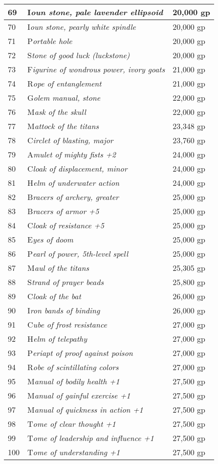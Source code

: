 \documentclass{article}
\begin{document}
\begin{tabular}{|>{\raggedright}p{14pt}|>{\raggedright}p{183pt}|>{\raggedright}p{55pt}|}
\hline
69 & I\textit{oun stone, pale lavender ellipsoid} & 20,000 gp\tabularnewline
\hline
70 & I\textit{oun stone, pearly white spindle} & 20,000 gp\tabularnewline
\hline
71 & P\textit{ortable hole} & 20,000 gp\tabularnewline
\hline
72 & S\textit{tone of good luck (luckstone)} & 20,000 gp\tabularnewline
\hline
73 & F\textit{igurine of wondrous power, ivory goats} & 21,000 gp\tabularnewline
\hline
74 & R\textit{ope of entanglement} & 21,000 gp\tabularnewline
\hline
75 & G\textit{olem manual, stone} & 22,000 gp\tabularnewline
\hline
76 & M\textit{ask of the skull} & 22,000 gp\tabularnewline
\hline
77 & M\textit{attock of the titans} & 23,348 gp\tabularnewline
\hline
78 & C\textit{irclet of blasting, major} & 23,760 gp\tabularnewline
\hline
79 & A\textit{mulet of mighty fists +2} & 24,000 gp\tabularnewline
\hline
80 & C\textit{loak of displacement, minor} & 24,000 gp\tabularnewline
\hline
81 & H\textit{elm of underwater action} & 24,000 gp\tabularnewline
\hline
82 & B\textit{racers of archery, greater} & 25,000 gp\tabularnewline
\hline
83 & B\textit{racers of armor +5} & 25,000 gp\tabularnewline
\hline
84 & C\textit{loak of resistance +5} & 25,000 gp\tabularnewline
\hline
85 & E\textit{yes of doom} & 25,000 gp\tabularnewline
\hline
86 & P\textit{earl of power, 5th-level spell} & 25,000 gp\tabularnewline
\hline
87 & M\textit{aul of the titans} & 25,305 gp\tabularnewline
\hline
88 & S\textit{trand of prayer beads} & 25,800 gp\tabularnewline
\hline
89 & C\textit{loak of the bat} & 26,000 gp\tabularnewline
\hline
90 & I\textit{ron bands of binding} & 26,000 gp\tabularnewline
\hline
91 & C\textit{ube of frost resistance} & 27,000 gp\tabularnewline
\hline
92 & H\textit{elm of telepathy} & 27,000 gp\tabularnewline
\hline
93 & P\textit{eriapt of proof against poison} & 27,000 gp\tabularnewline
\hline
94 & R\textit{obe of scintillating colors} & 27,000 gp\tabularnewline
\hline
95 & M\textit{anual of bodily health +1} & 27,500 gp\tabularnewline
\hline
96 & M\textit{anual of gainful exercise +1} & 27,500 gp\tabularnewline
\hline
97 & M\textit{anual of quickness in action +1} & 27,500 gp\tabularnewline
\hline
98 & T\textit{ome of clear thought +1} & 27,500 gp\tabularnewline
\hline
99 & T\textit{ome of leadership and influence +1} & 27,500 gp\tabularnewline
\hline
100 & T\textit{ome of understanding +1} & 27,500 gp\tabularnewline
\hline
\end{tabular}
\end{document}
